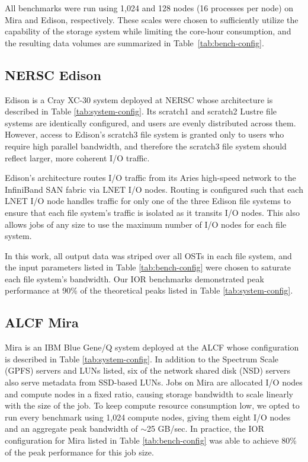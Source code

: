 All benchmarks were run using 1,024 and 128 nodes (16 processes per node) on Mira and Edison, respectively.
These scales were chosen to sufficiently utilize the capability of the storage system while limiting the core-hour consumption,
and the resulting data volumes are summarized in Table~\ref{tab:bench-config}.



\subsection{NERSC Edison} \label{sec:platforms/edison}

Edison is a Cray XC-30 system deployed at NERSC whose architecture is described in Table \ref{tab:system-config}.
Its scratch1 and scratch2 Lustre file systems are identically configured,
and users are evenly distributed across them.
However, access to Edison's scratch3 file system is granted only to users who require high parallel bandwidth, and therefore the scratch3 file system should reflect larger, more coherent I/O traffic.

Edison's architecture routes I/O traffic from its Aries high-speed network
to the InfiniBand SAN fabric via LNET I/O nodes.
Routing is configured such that each LNET I/O node handles traffic for only one of the three Edison file systems to ensure that each file system's traffic is isolated as it transits I/O nodes.
This also allows jobs of any size to use the maximum number of I/O nodes for each file system.

In this work, all output data was striped over all OSTs in each file system, and the input parameters listed in Table \ref{tab:bench-config} were chosen to saturate each file system's bandwidth.
Our IOR benchmarks demonstrated peak performance at 90\% of the theoretical peaks listed in Table \ref{tab:system-config}.

\subsection{ALCF Mira} \label{sec:platforms/mira}

Mira is an IBM Blue Gene/Q system deployed at the ALCF whose configuration is described in Table \ref{tab:system-config}.
In addition to the Spectrum Scale (GPFS) servers and LUNs listed, six of the network shared disk (NSD) servers also serve metadata from SSD-based LUNs.
Jobs on Mira are allocated I/O nodes and compute nodes in a fixed ratio, causing storage bandwidth to scale linearly with the size of the job.
To keep compute resource consumption low, we opted to run every benchmark using 1,024 compute nodes, giving them eight I/O nodes and an aggregate peak bandwidth of $\sim$25 GB/sec.
In practice, the IOR configuration for Mira listed in Table
\ref{tab:bench-config} was able to achieve 80\% of the peak performance for
this job size.


